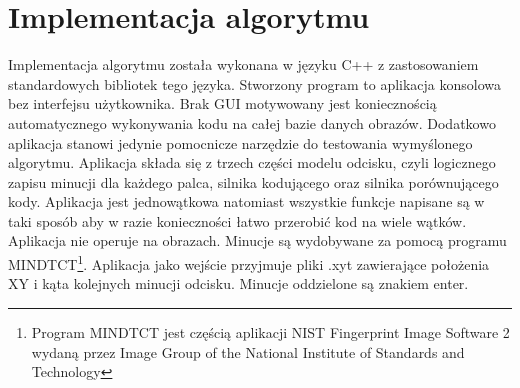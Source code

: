 \chapter{Implementacja algorytmu}

Implementacja algorytmu została wykonana w języku C++ z zastosowaniem standardowych bibliotek tego języka. Stworzony program to aplikacja konsolowa bez interfejsu użytkownika. Brak GUI motywowany jest koniecznością automatycznego wykonywania kodu na całej bazie danych obrazów. Dodatkowo aplikacja stanowi jedynie pomocnicze narzędzie do testowania wymyślonego algorytmu. Aplikacja składa się z trzech części modelu odcisku, czyli logicznego zapisu minucji dla każdego palca, silnika kodującego oraz silnika porównującego kody. Aplikacja jest jednowątkowa natomiast wszystkie funkcje napisane są w taki sposób aby w razie konieczności łatwo przerobić kod na wiele wątków. Aplikacja nie operuje na obrazach. Minucje są wydobywane za pomocą programu MINDTCT\footnote{Program MINDTCT jest częścią aplikacji NIST Fingerprint Image Software 2 wydaną przez Image Group of the National Institute of Standards and Technology}. Aplikacja jako wejście przyjmuje pliki .xyt zawierające położenia XY i kąta kolejnych minucji odcisku. Minucje oddzielone są znakiem enter. 
\newpage

